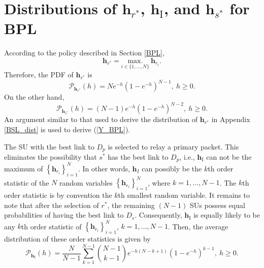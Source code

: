 \documentclass[journal,twocolumn]{IEEEtran}
\begin{document}
\section{Distributions of $\mathbf{h}_{r^*}$, $\mathbf{h}_{\mathrm{I}}$, and $\mathbf{h}_{s^*}$ for BPL} \label{BPL_dist}
According to the policy described in Section \ref{BPL}, 
\begin{equation}
\mathbf{h}_{r^*}=\underset{i \in \{1,\hdots,N\}}{{\mathrm{max.}}}~\mathbf{h}_{r_{i}}.
\end{equation}
Therefore, the PDF of $\mathbf{h}_{r^*}$ is
\begin{equation}\label{W_BPL}
\mathcal{P}_{\mathbf{h}_{r^*}}(h)=N e^{-h} (1-e^{-h})^{N-1},~h \geq 0.
\end{equation}     
On the other hand, 
\begin{equation}\label{Y_BPL}
\mathcal{P}_{\mathbf{h}_{s^*}}(h)=(N-1) e^{-h} (1-e^{-h})^{N-2},~ h \geq 0.
\end{equation} 
An argument similar to that used to derive the distribution of $\mathbf{h}_{r^*}$ in Appendix \ref{BSL_dist} is used to derive (\ref{Y_BPL}).

The SU with the best link to $D_{p}$ is selected to relay a primary packet. This eliminates the possibility that $s^*$ has the best link to $D_{p}$, i.e., $\mathbf{h}_{\mathrm{I}}$ can not be the maximum of $\left\{\mathbf{h}_{r_{i}}\right\}_{i=1}^{N}$. In other words, $\mathbf{h}_{I}$ can possibly be the $k$th order statistic of the $N$ random variables $\left\{\mathbf{h}_{r_{i}}\right\}_{i=1}^{N}$, where $k=1,\hdots,N-1$. The $k$th order statistic is by convention the $k$th smallest random variable.   
It remains to note that after the selection of $r^*$, the remaining $(N-1)$ SUs possess equal probabilities of having the best link to $D_{s}$. Consequently, $\mathbf{h}_{\mathrm{I}}$ is equally likely to be any $k$th order statistic of $\left\{\mathbf{h}_{r_{i}}\right\}_{i=1}^{N}$, $k=1,\hdots,N-1$. Then, the average distribution of these order statistics is given by 
\begin{equation} \label{X_BPL}
\mathcal{P}_{\mathbf{h}_{\mathrm{I}}}(h)\!\!=\!\!\frac{N}{N-1}\!\! \displaystyle \sum_{k=1}^{N-1}
\!\!{\!N\!-\!1 \choose k\!-\!1\!}  e^{-h(N-k+1)}   (1\!-\!e^{-h})^{k-1},~h \geq 0. 
\end{equation}   
\end{document}
